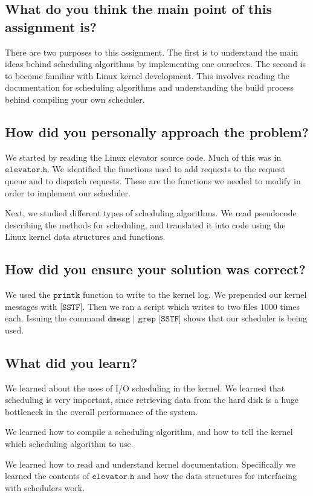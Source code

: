 \documentclass[letterpaper,10pt,titlepage]{article}
\begin{document}
\subsection{What do you think the main point of this assignment is?}
There are two purposes to this assignment. The first is to understand the main ideas behind scheduling algorithms by implementing one ourselves.
The second is to become familiar with Linux kernel development. This involves reading the documentation for scheduling algorithms and understanding the build process behind compiling your own scheduler.

\subsection{How did you personally approach the problem?}
We started by reading the Linux elevator source code. Much of this was in $\texttt{elevator.h}$. We identified the functions used to add requests to the request queue and to dispatch requests. These are the functions we needed to modify in order to implement our scheduler.

Next, we studied different types of scheduling algorithms. We read pseudocode describing the methods for scheduling, and translated it into code using the Linux kernel data structures and functions.
\subsection{How did you ensure your solution was correct?}
We used the $\texttt{printk}$ function to write to the kernel log. We prepended our kernel messages with $\texttt{[SSTF]}$.
Then we ran a script which writes to two files $1000$ times each. Issuing the command $\texttt{dmesg | grep [SSTF]}$ shows that our scheduler is being used.

\subsection{What did you learn?}
We learned about the uses of I/O scheduling in the kernel. We learned that scheduling is very important, since retrieving data from the hard disk is a huge bottleneck in the overall performance of the system.

We learned how to compile a scheduling algorithm, and how to tell the kernel which scheduling algorithm to use.

We learned how to read and understand kernel documentation. Specifically we learned the contents of $\texttt{elevator.h}$ and how the data structures for interfacing with schedulers work.
\end{document}
